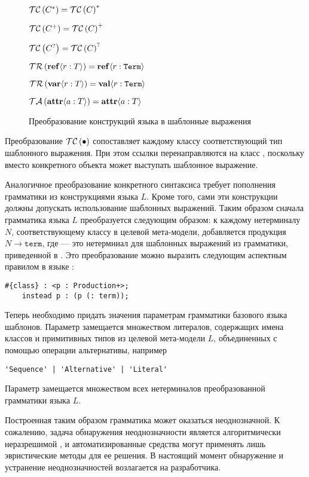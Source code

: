 {{\begin{figure}[htbp]
$\mathcal{TC}\left(C^*\right) = \mathcal{TC}\left(C\right)^*$

$\mathcal{TC}\left(C^+\right) = \mathcal{TC}\left(C\right)^+$

$\mathcal{TC}\left(C^?\right) = \mathcal{TC}\left(C\right)^?$

$\mathcal{TR}\left(\mathbf{ref}\langle r : T\rangle\right) = \mathbf{ref}\langle r : \mathtt{Term}\rangle$

$\mathcal{TR}\left(\mathbf{var}\langle r : T\rangle\right) = \mathbf{val}\langle r : \mathtt{Term}\rangle$

$\mathcal{TA}\left(\mathbf{attr}\langle a : T\rangle\right) = \mathbf{attr}\langle a : T\rangle$
	\caption{Преобразование конструкций языка в шаблонные выражения}\label{TC}
\end{figure}

Преобразование $\mathcal{TC}\left(\bullet\right)$ сопоставляет каждому классу соответствующий тип шаблонного выражения. При этом ссылки перенаправляются на класс , поскольку вместо конкретного объекта может выступать шаблонное выражение.

Аналогичное преобразование конкретного синтаксиса требует пополнения грамматики из  конструкциями языка $L$. Кроме того, сами эти конструкции должны допускать использование шаблонных выражений. Таким образом сначала грамматика языка $L$ преобразуется следующим образом: к каждому нетерминалу $N$, соответствующему классу в целевой мета-модели, добавляется продукция $N \rightarrow \mathtt{term}$, где  --- это нетермниал для шаблонных выражений из грамматики, приведенной в . Это преобразование можно выразить следующим аспектным правилом в языке \GRM{}:
\begin{lstlisting}
#{class} : <p : Production+>;
	instead p : (p (: term));
\end{lstlisting}
Теперь необходимо придать значения параметрам грамматики базового языка шаблонов. Параметр  замещается множеством литералов, содержащих имена классов и примитивных типов из целевой мета-модели $L$, объединенных с помощью операции альтернативы, например
\begin{lstlisting}[language=Grammatic]
	'Sequence' | 'Alternative' | 'Literal'
\end{lstlisting}
Параметр  замещается множеством всех нетерминалов преобразованной грамматики языка $L$.

Построенная таким образом грамматика может оказаться неоднозначной. К сожалению, задача обнаружения неоднозначности является алгоритмически неразрешимой \cite{???}, и автоматизированные средства могут применять лишь эвристические методы для ее решения. В настоящий момент обнаружение и устранение неоднозначностей возлагается на разработчика.

}}
